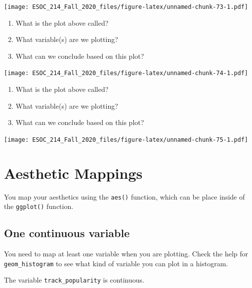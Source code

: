 \documentclass[
]{book}
\newenvironment{Shaded}{\begin{snugshade}}{\end{snugshade}}
\newcommand{\DataTypeTok}[1]{\textcolor[rgb]{0.13,0.29,0.53}{#1}}
\newcommand{\KeywordTok}[1]{\textcolor[rgb]{0.13,0.29,0.53}{\textbf{#1}}}
\newcommand{\NormalTok}[1]{#1}
\newcommand{\OperatorTok}[1]{\textcolor[rgb]{0.81,0.36,0.00}{\textbf{#1}}}
\newcommand{\StringTok}[1]{\textcolor[rgb]{0.31,0.60,0.02}{#1}}
\begin{document}
\texttt{[image: ESOC\_214\_Fall\_2020\_files/figure-latex/unnamed-chunk-73-1.pdf]}

\begin{enumerate}
\def\labelenumi{\arabic{enumi})}
\item
  What is the plot above called?
\item
  What variable(s) are we plotting?
\item
  What can we conclude based on this plot?
\end{enumerate}

\texttt{[image: ESOC\_214\_Fall\_2020\_files/figure-latex/unnamed-chunk-74-1.pdf]}

\begin{enumerate}
\def\labelenumi{\arabic{enumi})}
\item
  What is the plot above called?
\item
  What variable(s) are we plotting?
\item
  What can we conclude based on this plot?
\end{enumerate}

\texttt{[image: ESOC\_214\_Fall\_2020\_files/figure-latex/unnamed-chunk-75-1.pdf]}

\hypertarget{aesthetic-mappings}{%
\section{Aesthetic Mappings}\label{aesthetic-mappings}}

You map your aesthetics using the \texttt{aes()} function, which can be place inside of the \texttt{ggplot()} function.

\hypertarget{one-continuous-variable}{%
\subsection{One continuous variable}\label{one-continuous-variable}}

You need to map at least one variable when you are plotting. Check the help for \texttt{geom\_histogram} to see what kind of variable you can plot in a histogram.

The variable \texttt{track\_popularity} is continuous.

\begin{Shaded}
\end{Shaded}
\end{document}
